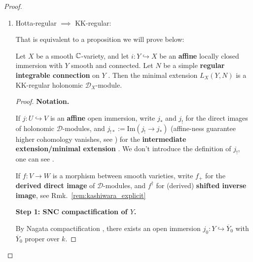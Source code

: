 \begin{remark}
\begin{proof}
\begin{enumerate}
            \item Hotta-regular $\implies$ KK-regular:

                  That is equivalent to a proposition we will prove below:
                  \begin{proposition}
                      Let $X$ be a smooth $\mathbb{C}$-variety, and let $i:Y\hookrightarrow X$ be an \textbf{affine} \cite[\href{https://stacks.math.columbia.edu/tag/01S6}{Tag 01S6}]{stacks-project}
                      locally closed immersion with $Y$ smooth and connected.
                      Let $N$ be a simple \textbf{regular integrable connection}
                      on $Y$ \cite[Thm.~5.2.17, Thm.~5.2.20, Lem.~5.3.1, and Prop.~5.3.8.]{hotta2008d}.
                      Then the minimal extension $L_X(Y,N)$ is a KK-regular
                      holonomic $\mathcal D_X$-module.
                  \end{proposition}

                  \begin{proof}
                      \textbf{Notation.}

                      If $j:U\hookrightarrow V$ is an \textbf{affine} open immersion, write $j_*$ and $j_!$ for the
                      direct images of holonomic $\mathcal D$-modules, and $j_{!*}:=\mathrm{Im}(j_!\to j_*)$
                      (affine-ness guarantee higher cohomology vanishes, see \cite[Sect.~3.4]{hotta2008d})
                      for the \textbf{intermediate extension/minimal extension} \cite[Thm.~3.2.16]{hotta2008d}.
                      We don't introduce the definition of $j_!$, one can see \cite[Def.~3.2.13]{hotta2008d}.

                      If $f:V\to W$ is a morphism between smooth varieties, write $f_+$ for the \textbf{derived
                          direct image} of $\mathcal D$-modules, and $f^\dagger$ for (derived) \textbf{shifted inverse image},
                      see Rmk.~\ref{rem:kashiwara_explicit}

                      \medskip

                      \textbf{Step 1: SNC compactification of $Y$.}

                      By Nagata compactification \cite[\href{https://stacks.math.columbia.edu/tag/0ATT}{Tag 0ATT}, \href{https://stacks.math.columbia.edu/tag/0F41}{Tag 0F41}]{stacks-project},
                      there exists an open immersion $j_0:Y\hookrightarrow \overline Y_0$
                      with $\overline Y_0$ proper over $k$.


\end{proof}
\end{enumerate}
\end{proof}
\end{remark}
